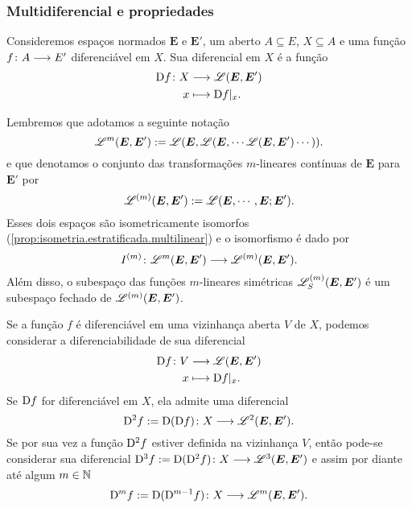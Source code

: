 \subsubsection{Multidiferencial e propriedades}

Consideremos espaços normados $\bm E$ e $\bm E'$, um aberto $A \subseteq E$, $X \subseteq A$ e uma função ${f}\colon {A} \longrightarrow {E'}$ diferenciável em $X$. Sua diferencial em $X$ é a função
	\begin{align*}
	{\mathrm{D}f}\colon {X} &\longrightarrow {\mathscr{L}(\bm E, \bm E')} \\{x} &\longmapsto \mathrm{D} f|_x.
	\end{align*}

Lembremos que adotamos a seguinte notação
	\begin{equation*}
	\mathscr{L}^{m}(\bm E, \bm E') := \mathscr{L}(\bm E, \mathscr{L}(\bm E, \cdots \mathscr{L}(\bm E, \bm E')\cdots)).
	\end{equation*}
e que denotamos o conjunto das transformações $m$-lineares contínuas de $\bm E$ para $\bm E'$ por
	\begin{equation*}
	\mathscr{L}^{(m)}(\bm E, \bm E') := \mathscr{L}(\bm E,\cdots, \bm E; \bm E').
	\end{equation*}
Esses dois espaços são isometricamente isomorfos (\ref{prop:isometria.estratificada.multilinear}) e o isomorfismo é dado por
	\begin{equation*}
	{I^{(m)}}\colon {\mathscr{L}^m(\bm E, \bm E')} \longrightarrow {\mathscr{L}^{(m)}(\bm E, \bm E')}.
	\end{equation*}
Além disso, o subespaço das funções $m$-lineares simétricas $\mathscr{L}_{S}^{(m)}(\bm E, \bm E')$ é um subespaço fechado de $\mathscr{L}^{(m)}(\bm E, \bm E')$.

Se a função $f$ é diferenciável em uma vizinhança aberta $V$ de $X$, podemos considerar a diferenciabilidade de sua diferencial
	\begin{align*}
	{\mathrm{D}f}\colon {V} &\longrightarrow {\mathscr{L}(\bm E, \bm E')} \\{x} &\longmapsto \mathrm{D} f|_x.
	\end{align*}
Se $\mathrm{D} f$ for diferenciável em $X$, ela admite uma diferencial
	\begin{equation*}
	{\mathrm{D}^2 f := \mathrm{D}(\mathrm{D}f)}\colon {X} \longrightarrow {\mathscr{L}^2(\bm E, \bm E')}.
	\end{equation*}
Se por sua vez a função $\mathrm{D}^2 f$ estiver definida na vizinhança $V$, então pode-se considerar sua diferencial $\mathrm{D}^3 f := {\mathrm{D}(\mathrm{D}^2 f)}\colon {X} \longrightarrow {\mathscr{L}^3(\bm E, \bm E')}$ e assim por diante até algum $m \in \mathbb{N}$
	\begin{equation*}
	\mathrm{D}^m f := {\mathrm{D} (\mathrm{D}^{m-1} f)}\colon {X} \longrightarrow {\mathscr{L}^m(\bm E, \bm E')}.
	\end{equation*}

